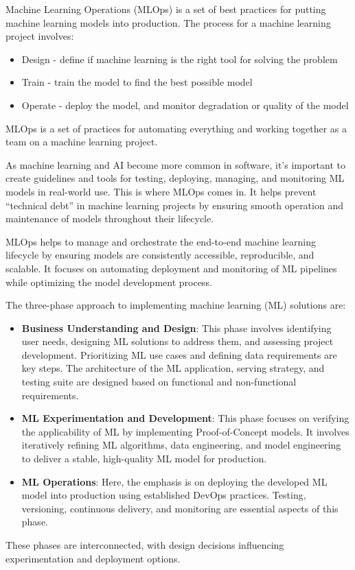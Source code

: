 \documentclass[letterpaper,12pt,notitlepage,twoside]{report}
\begin{document}
Machine Learning Operations (MLOps) is a set of best practices for putting machine learning models into production. The process for a machine learning project involves:
\begin{itemize}
	\item Design - define if machine learning is the right tool for solving the problem
	\item Train - train the model to find the best possible model
	\item Operate - deploy the model,  and monitor degradation or quality of the model
\end{itemize}
MLOps is a set of practices for automating everything and working together as a team on a machine learning project.

 \begin{funfact}[frametitle=\facttitlep{Fun Fact}{MLOps Principles}]
As machine learning and AI become more common in software, it's important to create guidelines and tools for testing, deploying, managing, and monitoring ML models in real-world use. This is where MLOps comes in. It helps prevent ``technical debt'' in machine learning projects by ensuring smooth operation and maintenance of models throughout their lifecycle.
\end{funfact}

MLOps helps to manage and orchestrate the end-to-end machine learning lifecycle by ensuring models are consistently accessible, reproducible, and scalable. It focuses on automating deployment and monitoring of ML pipelines while optimizing the model development process.

The three-phase approach to implementing machine learning (ML) solutions are:
\begin{itemize}
\item \textbf{Business Understanding and Design}: This phase involves identifying user needs, designing ML solutions to address them, and assessing project development. Prioritizing ML use cases and defining data requirements are key steps. The architecture of the ML application, serving strategy, and testing suite are designed based on functional and non-functional requirements.
\item \textbf{ML Experimentation and Development}: This phase focuses on verifying the applicability of ML by implementing Proof-of-Concept models. It involves iteratively refining ML algorithms, data engineering, and model engineering to deliver a stable, high-quality ML model for production.
\item \textbf{ML Operations}: Here, the emphasis is on deploying the developed ML model into production using established DevOps practices. Testing, versioning, continuous delivery, and monitoring are essential aspects of this phase.
\end{itemize}
These phases are interconnected, with design decisions influencing experimentation and deployment options.
\end{document}
